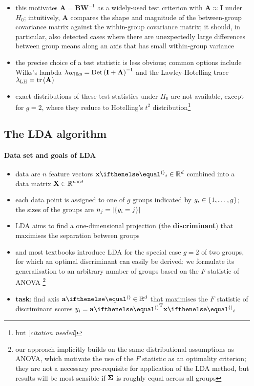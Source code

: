 \documentclass[a4paper]{article}
\begin{document}
\begin{itemize}
\item this motivates $\mathbf{A} = \mathbf{B} \mathbf{W}^{-1}$ as a widely-used test criterion with $\mathbf{A}\approx \mathbf{I}$ under $H_0$; intuitively, $\mathbf{A}$ compares the shape and magnitude of the between-group covariance matrix against the within-group covariance matrix; it should, in particular, also detected cases where there are unexpectedly large differences between group means along an axis that has small within-group variance
\item the precise choice of a test statistic is less obvious; common options include Wilks's lambda $\lambda_{\text{Wilks}} = \mathop{\text{Det}}\left(\mathbf{I} + \mathbf{A}\right)^{-1}$ and the Lawley-Hotelling trace $\lambda_{\text{LH}} = \mathop{\text{tr}}\left(\mathbf{A}\right)$
\item exact distributions of these test statistics under $H_0$ are not available, except for $g = 2$, where they reduce to Hotelling's $t^2$ distribution\footnote{but [\emph{citation needed}]}
\end{itemize}

\subsection{The LDA algorithm}
\label{sec:lda:standard}

\paragraph{Data set and goals of LDA}

\begin{itemize}
\item data are $n$ feature vectors $\vx_i \in \setR^d$ combined into a data matrix $\mathbf{X}\in \mathbb{R}^{n\times d}$
\item each data point is assigned to one of $g$ groups indicated by $g_i\in \left\{1, \ldots, g\right\}$; the sizes of the groups are $n_j = \left\lvert\left\{g_i = j\right\}\right\rvert$
\item LDA aims to find a one-dimensional projection (the \textbf{discriminant}) that maximises the separation between groups
\item \citet{Fisher:36} and most textbooks introduce LDA for the special case $g = 2$ of two groups, for which an optimal discriminant can easily be derived; we formulate its generalisation to an arbitrary number of groups based on the $F$ statistic of ANOVA%
  \footnote{our approach implicitly builds on the same distributional assumptions as ANOVA, which motivate the use of the $F$ statistic as an optimality criterion; they are not a necessary pre-requisite for application of the LDA method, but results will be most sensible if $\boldsymbol{\Sigma}$ is roughly equal across all groups}
\item \textbf{task}: find axis $\va\in \setR^d$ that maximises the $F$ statistic of discriminant scores $y_i = \va\T \vx_i$
\end{itemize}
\end{document}
